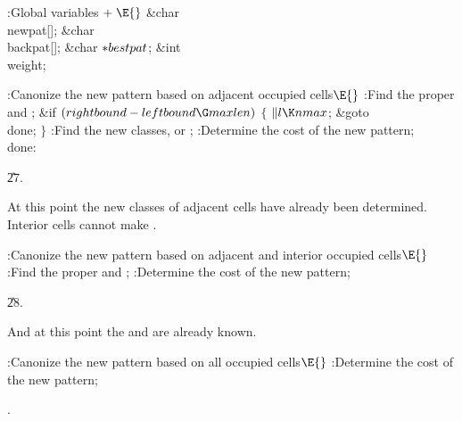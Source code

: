 \B{}:Global variables\X${}\mathrel+\E{}$\6
\&{char} \\{newpat}[];\6
\&{char} \\{backpat}[];\6
\&{char} ${}{*}\\{bestpat}{}$;\6
\&{int} \\{weight};\par
\fi

\B{}:Canonize the new pattern based on adjacent occupied cells\X${}%
\E{}$\6
:Find the proper  and \X;\6
\&{if} ${}(\\{rightbound}-\\{leftbound}\G\\{maxlen}){}$\5
${}\{{}$\1\6
${}\|l\K\\{nmax}{}$;\5
\&{goto} \\{done};\6
\4${}\}{}$\2\6
:Find the new classes, or \X;\6
:Determine the cost of the new pattern\X;\6
\4\\{done}:\par
\U27.\fi

At this point the new classes of adjacent cells have already been
determined.
Interior cells cannot make .

\Y\B\4:Canonize the new pattern based on adjacent and interior occupied
cells\X${}\E{}$\6
:Find the proper  and \X;\6
:Determine the cost of the new pattern\X;\par
\U28.\fi

And at this point the  and  are
already known.

\Y\B\4:Canonize the new pattern based on all occupied cells\X${}\E{}$\6
:Determine the cost of the new pattern\X;\par
{}.\fi

